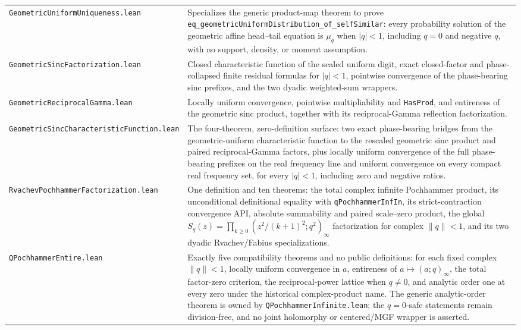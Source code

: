 \documentclass[11pt,oneside]{article}
\theoremstyle{definition}
\theoremstyle{remark}
\begin{document}
\begin{longtable}{>{\raggedright\arraybackslash}p{} >{\raggedright\arraybackslash}p{}}
\nolinkurl{GeometricUniformUniqueness.lean} & Specializes the generic product-map theorem to prove \nolinkurl{eq_geometricUniformDistribution_of_selfSimilar}: every probability solution of the geometric affine head--tail equation is \(\mu_q\) when \(\lvert q\rvert<1\), including \(q=0\) and negative \(q\), with no support, density, or moment assumption. \\
\nolinkurl{GeometricSincFactorization.lean} & Closed characteristic function of the scaled uniform digit, exact closed-factor and phase-collapsed finite residual formulas for \(\lvert q\rvert<1\), pointwise convergence of the phase-bearing sinc prefixes, and the two dyadic weighted-sum wrappers. \\
\nolinkurl{GeometricReciprocalGamma.lean} & Locally uniform convergence, pointwise multipliability and \nolinkurl{HasProd}, and entireness of the geometric sinc product, together with its reciprocal-Gamma reflection factorization. \\
\nolinkurl{GeometricSincCharacteristicFunction.lean} & The four-theorem, zero-definition surface: two exact phase-bearing bridges from the geometric-uniform characteristic function to the rescaled geometric sinc product and paired reciprocal-Gamma factors, plus locally uniform convergence of the full phase-bearing prefixes on the real frequency line and uniform convergence on every compact real frequency set, for every \(\lvert q\rvert<1\), including zero and negative ratios. \\
\nolinkurl{RvachevPochhammerFactorization.lean} & One definition and ten theorems: the total complex infinite Pochhammer product, its unconditional definitional equality with \nolinkurl{qPochhammerInfIn}, its strict-contraction convergence API, absolute summability and paired scale--zero product, the global \(S_q(z)=\prod_{k\ge0}(z^2/(k+1)^2;q^2)_\infty\) factorization for complex \(\lVert q\rVert<1\), and its two dyadic Rvachev/Fabius specializations. \\
\nolinkurl{QPochhammerEntire.lean} & Exactly five compatibility theorems and no public definitions: for each fixed complex \(\lVert q\rVert<1\), locally uniform convergence in \(a\), entireness of \(a\mapsto(a;q)_\infty\), the total factor-zero criterion, the reciprocal-power lattice when \(q\ne0\), and analytic order one at every zero under the historical complex-product name.  The generic analytic-order theorem is owned by \nolinkurl{QPochhammerInfinite.lean}; the \(q=0\)-safe statements remain division-free, and no joint holomorphy or centered/MGF wrapper is asserted. \\

\end{longtable}
\end{document}
